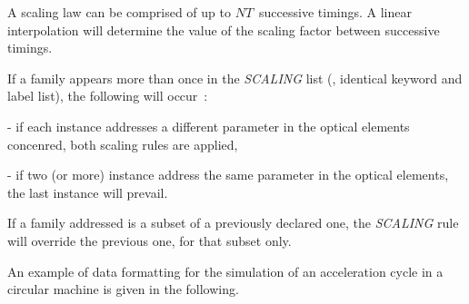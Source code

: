 {\bigskip

\noindent A scaling law can be comprised  of up to $NT$~successive timings.  
A linear interpolation will determine the value of the scaling factor between successive timings. 

\bigskip

\noindent If a family appears more than once in the \textsl{SCALING} list 
(\ie, identical keyword and label list), the following will occur~:
 
- if each instance addresses a different parameter in the optical elements concenred, both scaling rules are applied, 

- if two (or more) instance address the same parameter in the optical elements, the last instance will prevail. 

\noindent If a family addressed is a subset of a previously declared one, the \textsl{SCALING} rule will 
override the previous one, for that subset only.  
 


\bigskip

\noindent An example of data formatting for the simulation of an acceleration cycle in a circular 
machine is given in the following. 

\bigskip

}
